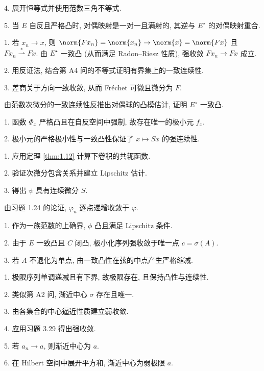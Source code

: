 4. 展开恒等式并使用范数三角不等式.

5. 当 $E$ 自反且严格凸时, 对偶映射是一对一且满射的, 其逆与 $E^\star$ 的对偶映射重合.


1. 若 $x_n\to x$, 则 $\norm{Fx_n}=\norm{x_n}\to\norm{x}=\norm{Fx}$ 且 $Fx_n\overset{*}{\rightharpoonup}Fx$.
由 $E^\star$ 一致凸 (从而满足 Radon--Riesz 性质), 强收敛 $Fx_n\to Fx$ 成立.

2. 用反证法, 结合第 A4 问的不等式证明有界集上的一致连续性.

3. 差商关于方向一致收敛, 从而 Fréchet 可微且微分为 $F$.


由范数次微分的一致连续性反推出对偶球的凸模估计, 证明 $E^\star$ 一致凸.



1. 函数 $\Phi_x$ 严格凸且在自反空间中强制, 故存在唯一的极小元 $f_x$.

2. 极小元的严格极小性与一致凸性保证了 $x\mapsto Sx$ 的强连续性.


1. 应用定理  \ref{thm:1.12} 计算下卷积的共轭函数.

2. 验证次微分包含关系并建立 Lipschitz 估计.

3. 得出 $\psi$ 具有连续微分 $S$.


由习题 1.24 的论证, $\varphi_n$ 逐点递增收敛于 $\varphi$.



1. 作为一族范数的上确界, $\phi$ 凸且满足 Lipschitz 条件.

2. 由于 $E$ 一致凸且 $C$ 闭凸, 极小化序列强收敛于唯一点 $c=\sigma(A)$.

3. 若 $A$ 不退化为单点, 由一致凸性在弦的中点产生严格缩减.


1. 极限序列单调递减且有下界, 故极限存在, 且保持凸性与连续性.

2. 类似第 A2 问, 渐近中心 $\sigma$ 存在且唯一.

3. 由各集合的中心逼近性质建立弱收敛.

4. 应用习题 3.29 得出强收敛.

5. 若 $a_n\to a$, 则渐近中心为 $a$.

6. 在 Hilbert 空间中展开平方和, 渐近中心为弱极限 $a$.

